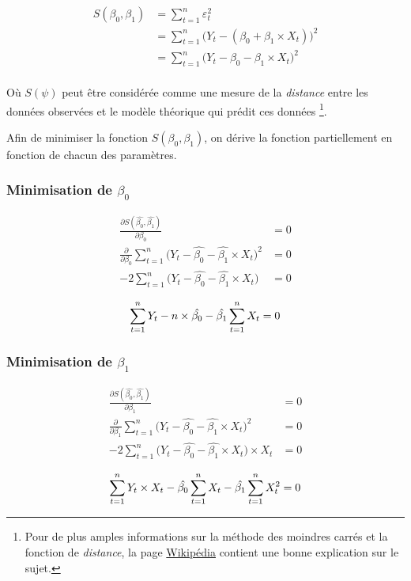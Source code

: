 \documentclass[11pt,french]{report}
\begin{document}
\begin{align*}
S(\beta_0, \beta_1) &= \displaystyle\sum_{t=1}^n \varepsilon_t^2 \\
&= \displaystyle\sum_{t=1}^n \big( Y_t - (\beta_0 + \beta_1\times X_t) \big)^2 \\
&= \displaystyle\sum_{t=1}^n \big( Y_t - \beta_0 - \beta_1\times X_t \big)^2 \\
\end{align*}

Où $S(\psi)$ peut être considérée comme une mesure de la \emph{distance} entre les données observées et le modèle théorique qui prédit ces données \footnote{Pour de plus amples informations sur la méthode des moindres carrés et la fonction de \emph{distance}, la page \href{https://fr.wikipedia.org/wiki/Méthode_des_moindres_carrés}{Wikipédia} contient une bonne explication sur le sujet.}.

\bigskip
Afin de minimiser la fonction $S(\beta_0, \beta_1)$, on dérive la fonction partiellement en fonction de chacun des paramètres.

\subsubsection{Minimisation de $\beta_0$}
\begin{align*}
\frac{\partial S(\hat{\beta_0}, \hat{\beta_1})}{\partial \beta_0} &= 0 \\
\frac{\partial}{\partial \beta_0} \displaystyle\sum_{t=1}^n \big( Y_t - \hat{\beta_0} - \hat{\beta_1}\times X_t \big)^2 &= 0 \\
-2\displaystyle\sum_{t=1}^n \big( Y_t - \hat{\beta_0} - \hat{\beta_1} \times X_t \big) &= 0 \\
\end{align*}
\begin{equation}
\label{eq:minimisationbeta0}
\displaystyle\sum_{t=1}^n Y_t - n \times \hat{\beta_0} - \hat{\beta_1} \displaystyle\sum_{t=1}^n X_t = 0 \\
\end{equation}

\subsubsection{Minimisation de $\beta_1$}
\begin{align*}
\frac{\partial S(\hat{\beta_0}, \hat{\beta_1})}{\partial \beta_1} &= 0 \\
\frac{\partial}{\partial \beta_1} \displaystyle\sum_{t=1}^n \big( Y_t - \hat{\beta_0} - \hat{\beta_1}\times X_t \big)^2 &= 0 \\
-2\displaystyle\sum_{t=1}^n \big( Y_t - \hat{\beta_0} - \hat{\beta_1} \times X_t \big) \times X_t &= 0 \\
\end{align*}
\begin{equation}
\label{eq:minimisationbeta1}
\displaystyle\sum_{t=1}^n Y_t \times X_t - \hat{\beta_0} \displaystyle\sum_{t=1}^n X_t - \hat{\beta_1} \displaystyle\sum_{t=1}^n X_t^2 = 0 \\
\end{equation}
\end{document}
